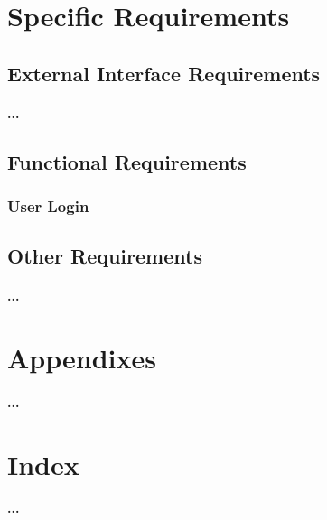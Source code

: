 \documentclass[runningheads,a4paper]{article}
\begin{document}


\section{Specific Requirements}

\subsection{External Interface Requirements}
\paragraph{...}
\subsection{Functional Requirements}

\subsubsection{User Login}
\subsection{Other Requirements}
\paragraph{...}

\section{Appendixes}
\paragraph{...}

\section{Index}
\paragraph{...}
\end{document}
